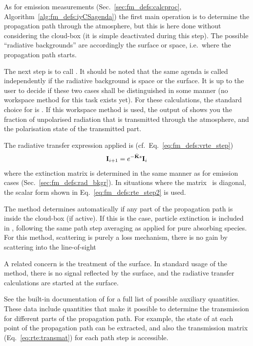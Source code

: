 As for emission measurements (Sec.~\ref{sec:fm_defs:calcproc},
Algorithm~\ref{alg:fm_defs:iyCSagenda}) the first main operation is to
determine the propagation path through the atmosphere, but this is here done
without considering the cloud-box (it is simple deactivated during this step).
The possible ``radiative backgrounds'' are accordingly the surface or space,
i.e.\ where the propagation path starts. 

The next step is to call . It should be
noted that the same agenda is called independently if the radiative background
is space or the surface. It is up to the user to decide if these two cases
shall be distinguished in some manner (no workspace method for this task exists
yet). For these calculations, the standard choice for
 is . If this
workspace method is used, the output of 
shows you the fraction of unpolarised radiation that is transmitted through the
atmosphere, and the polarisation state of the transmitted part.

The radiative transfer expression applied is
(cf.~Eq.~\ref{eq:fm_defs:vrte_step})
\begin{equation}
  \label{eq:trans:vrte}
  {\bf I}_{i+1} = e^{-\bar{{\bf K}}s} {\bf I}_i 
\end{equation}
where the extinction matrix is determined in the same manner as for emission
cases (Sec.~\ref{sec:fm_defs:rad_bkgr}). In situations where the matrix
\ExtMat\ is diagonal, the scalar form shown in Eq.~\ref{eq:fm_defs:rte_step2}
is used.

The method determines automatically if any part of the propagation path is
inside the cloud-box (if active). If this is the case, particle extinction is
included in \ExtMat, following the same path step averaging as applied for
pure absorbing species. For this method, scattering is purely a loss mechanism,
there is no gain by scattering into the line-of-sight

A related concern is the treatment of the surface. In standard usage of the
method, there is no signal reflected by the surface, and the radiative transfer
calculations are started at the surface.

See the built-in documentation of  for a
full list of possible auxiliary quantities. These data include quantities that
make it possible to determine the transmission for different parts of the
propagation path. For example, the state of  at each point of
the propagation path can be extracted, and also the transmission matrix
(Eq.~\ref{eq:rte:transmat}) for each path step is accessible.





